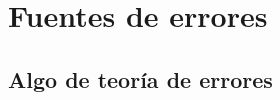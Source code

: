 \documentclass[12pt]{beamer}
\begin{document}

\section{Fuentes de errores}
\subsection{Algo de teoría de errores}
\end{document}

